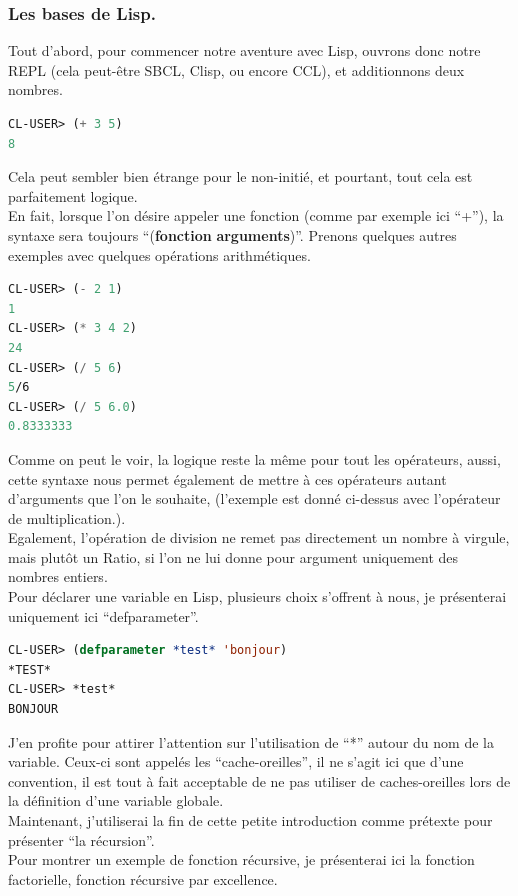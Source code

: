 \documentclass[a4paper, 12pt]{article}
\numberwithin{equation}{subsection}
\begin{document}
\subsubsection{Les bases de Lisp.}
Tout d'abord, pour commencer notre aventure avec Lisp, ouvrons donc notre REPL (cela peut-être SBCL, Clisp, ou encore CCL), et additionnons deux nombres. \\
\begin{lstlisting}[language=Lisp]
CL-USER> (+ 3 5)
8
\end{lstlisting}
Cela peut sembler bien étrange pour le non-initié, et pourtant, tout cela est parfaitement logique. \\
En fait, lorsque l'on désire appeler une fonction (comme par exemple ici ``+''), la syntaxe sera toujours ``({\bf fonction} {\bf arguments})''. Prenons quelques autres exemples avec quelques opérations arithmétiques. \\
\begin{lstlisting}[language=Lisp]
CL-USER> (- 2 1)
1
CL-USER> (* 3 4 2)
24
CL-USER> (/ 5 6)
5/6
CL-USER> (/ 5 6.0)
0.8333333
\end{lstlisting}
Comme on peut le voir, la logique reste la même pour tout les opérateurs, aussi, cette syntaxe nous permet également de mettre à ces opérateurs autant d'arguments que l'on le souhaite, (l'exemple est donné ci-dessus avec l'opérateur de multiplication.). \\
Egalement, l'opération de division ne remet pas directement un nombre à virgule, mais plutôt un Ratio, si l'on ne lui donne pour argument uniquement des nombres entiers. \\
Pour déclarer une variable en Lisp, plusieurs choix s'offrent à nous, je présenterai uniquement ici ``defparameter''.
\begin{lstlisting}[language=Lisp]
CL-USER> (defparameter *test* 'bonjour)
*TEST*
CL-USER> *test*
BONJOUR
\end{lstlisting}
J'en profite pour attirer l'attention sur l'utilisation de ``*'' autour du nom de la variable. Ceux-ci sont appelés les ``cache-oreilles'', il ne s'agit ici que d'une convention, il est tout à fait acceptable de ne pas utiliser de caches-oreilles lors de la définition d'une variable globale. \\[0.2cm]
Maintenant, j'utiliserai la fin de cette petite introduction comme prétexte pour présenter ``la récursion''. \\
Pour montrer un exemple de fonction récursive, je présenterai ici la fonction factorielle, fonction récursive par excellence. \\
\end{document}
